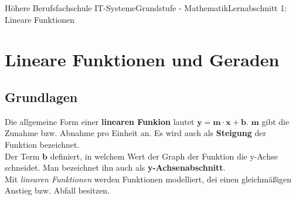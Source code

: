 \documentclass[11pt,twocolumn,oneside,openany,headings=optiontotoc,11pt,numbers=noenddot]{article}
\begin{document}
	\begin{worksheet}{Höhere Berufsfachschule IT-Systeme}{Grundstufe - 
		Mathematik}{Lernabschnitt 1: Lineare Funktionen}
		\section{Lineare Funktionen und Geraden}
		\label{sec:lfug}
		\subsection{Grundlagen}
		Die allgemeine Form einer \textbf{linearen Funkion} lautet \(\mathbf{y = m\cdot{}x + b}\). \(\mathbf{m}\) gibt die Zunahme bzw. Abnahme pro Einheit an. Es wird auch als \textbf{Steigung} der Funktion bezeichnet.\\
		Der Term \(\mathbf{b}\) definiert, in welchem Wert der Graph der Funktion die y-Achse schneidet. Man bezeichnet ihn auch als \textbf{y-Achsenabschnitt}.\\
		Mit \textit{linearen Funktionen} werden Funktionen modelliert, dei einen gleichmäßigen Anstieg bzw. Abfall besitzen.

\end{worksheet}
\end{document}
